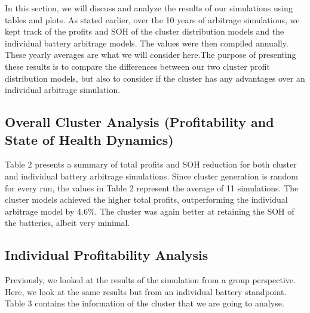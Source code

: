 \documentclass[conference]{IEEEtran}
\begin{document}
In this section, we will discuss and analyze the results of our simulations using tables and plots. As stated earlier, over  the 10 years of arbitrage simulations, we kept track of the profits and SOH of the cluster distribution models and the individual battery arbitrage models. The values were then compiled annually. These yearly averages are what we will consider here.The purpose of presenting these results is to compare the differences between our two cluster profit distribution models, but also to consider if the cluster has any advantages over an individual arbitrage simulation.

\subsection{Overall Cluster Analysis (Profitability and State of Health Dynamics)}

Table 2 presents a summary of total profits and SOH reduction for both cluster and individual battery arbitrage simulations. Since cluster generation is random for every run, the values in Table 2 represent the average of 11 simulations. The cluster models achieved the higher total profits, outperforming the individual arbitrage model by 4.6\%. The cluster was again better at retaining the SOH of the batteries, albeit very minimal.

\begin{table}[htbp]
\caption{Comparison of Models Based on Profits and SOH Decrease}
\begin{center}
\end{center}
\end{table}

\subsection{Individual Profitability Analysis}

Previously, we looked at the results of the simulation from a group perspective. Here, we look at the same results but from an individual battery standpoint. Table 3 contains the information of the cluster that we are going to analyse.
\end{document}
